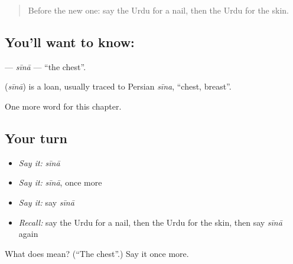 \begin{quote}
Before the new one: say the Urdu for a nail, then the Urdu for the skin.
\end{quote}

\subsection*{You'll want to know: }
\textbf{} — \emph{sīnā} — \textquotedblleft{}the chest\textquotedblright{}.

\begin{cousinweb}
\textbf{} (\emph{sīnā}) is a loan, usually traced to Persian \emph{sīna}, \textquotedblleft{}chest, breast\textquotedblright{}.
\end{cousinweb}

\begin{grammarlens}[title={What you've built}]
One more word for this chapter.
\end{grammarlens}

\subsection*{Your turn}
\begin{itemize}
\raggedright
  \item \emph{Say it:} \emph{sīnā}
  \item \emph{Say it:} \emph{sīnā}, once more
  \item \emph{Say it:} say \emph{sīnā}
  \item \emph{Recall:} say the Urdu for a nail, then the Urdu for the skin, then say \emph{sīnā} again
\end{itemize}

\begin{tcolorbox}[breakable,colback=teal!4,colframe=teal!35!black,title={Before you move on}]
What does  mean? (\textquotedblleft{}The chest\textquotedblright{}.) Say it once more.
\end{tcolorbox}

